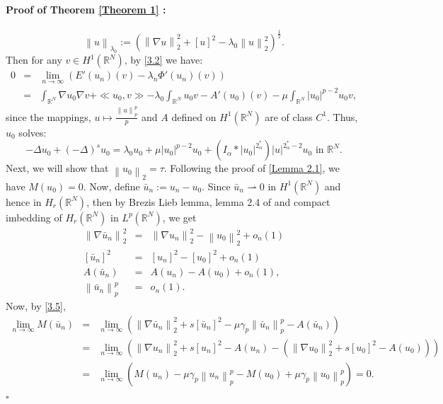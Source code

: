 \documentclass[11pt]{article}
\numberwithin{equation}{section}
\numberwithin{mytheorem}{section}
\newenvironment{myproof}[2] {\paragraph{Proof of {#1} {#2} :}}{\hfill$\square$}
\begin{document}
\begin{myproof}{Theorem}{\ref{Theorem 1}}
			$$\left\| u \right\|_{\lambda_0}:=(\left\|\nabla u \right\|_2^2+[u]^2-\lambda_0\left\| u \right\|_2^2)^{\frac{1}{2}}.$$
			Then for any $v\in H^1(\mathbb{R}^N)$, by \eqref{3.2} we have:
			\begin{eqnarray}\label{3.4}
				0 & = & \lim_{n\rightarrow \infty}\left(E'(u_n)(v)-\lambda_n\Phi'(u_n)(v)\right)\nonumber\\
				& = & \int_{\mathbb R^N}\nabla u_0\nabla v +\ll u_0, v \gg- \lambda_0\int_{\mathbb{R}^N}u_0v-A'(u_0)(v)-\mu\int_{\mathbb{R}^N}|u_0|^{p-2}u_0 v,
			\end{eqnarray}
			since the mappings, $u\mapsto \frac{\left\|u \right\|_p^p}{p}$ and $A$ defined on $H^1(\mathbb{R}^N)$ are of class $C^1$. Thus, $u_0$ solves:
			$$-\Delta u_0 +(-\Delta)^su_0 = \lambda_0u_0+\mu|u_0|^{p-2}u_0+(I_{\alpha}*|u_0|^{2^*_{\alpha}})|u|^{2^*_{\alpha}-2}u_0 \text{ in } \mathbb{R}^N.$$
			Next, we will show that $\left\| u_0 \right\|_2=\tau$.
			Following the proof of \autoref{Lemma 2.1}, we have $M(u_0)=0$. Now, define $\bar{u}_n:=u_n-u_0$.
			Since $\bar{u}_n\rightharpoonup 0$ in $H^1(\mathbb{R}^N)$ and hence in $H_r(\mathbb{R}^N)$, then by Brezis Lieb lemma, lemma 2.4 of \cite{Moroz2013groundstates} and compact imbedding of $H_r(\mathbb{R}^N)$ in $L^p(\mathbb{R}^N)$, we get
			\begin{equation}\label{3.5}
				\begin{array}{rcl}
					\left\| \nabla \bar{u}_n \right\|_2^2 & = & \left\| \nabla u_n \right\|_2^2-\left\| u_0 \right\|_2^2+o_n(1)\\
					\left[\bar{u}_n\right]^2 & = & [u_n]^2-[u_0]^2+o_n(1)\\
					A(\bar{u}_n) & = & A(u_n)-A(u_0)+o_n(1),\\
					\left\| \bar{u}_n \right\|_p^p & = & o_n(1).
				\end{array}
			\end{equation}
			Now, by \eqref{3.5},
			\begin{eqnarray*}
				\lim_{n\rightarrow \infty}M(\bar{u}_n) & = & \lim_{n\rightarrow \infty}\left(\left\| \nabla \bar{u}_n \right\|_2^2+s[\bar{u}_n]^2-\mu \gamma_p\left\| \bar{u}_n\right\|_p^p-A(\bar{u}_n)\right)\\
				& = & \lim_{n\rightarrow \infty}\left(\left\| \nabla u_n \right\|_2^2+s[u_n]^2-A(u_n)- (\left\| \nabla u_0 \right\|_2^2+s[u_0]^2-A(u_0))\right) \\
				& = & \lim_{n\rightarrow \infty} \left(M(u_n)-\mu\gamma_p\left\| u_n \right\|_p^p-M(u_0)+\mu\gamma_p\left\| u_0 \right\|_p^p \right)= 0.

\end{eqnarray*}
\end{myproof}
\end{document}
